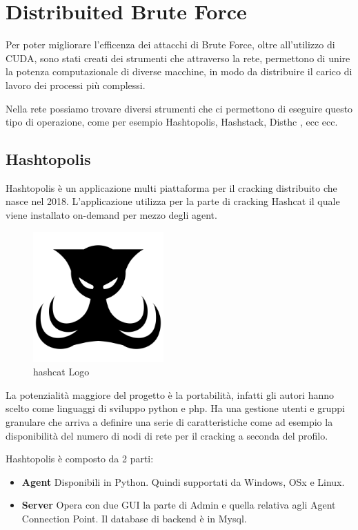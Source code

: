 \chapter{Distribuited Brute Force}

Per poter migliorare l'efficenza dei attacchi di Brute Force, oltre all'utilizzo di CUDA, sono stati creati dei strumenti che attraverso la rete, permettono di unire la potenza computazionale di diverse macchine, in modo da distribuire il carico di lavoro dei processi più complessi.

Nella rete possiamo trovare diversi strumenti che ci permettono di eseguire questo tipo di operazione, come per esempio Hashtopolis, Hashstack, Disthc , ecc ecc.

\section{Hashtopolis}

Hashtopolis \cite{hashtopolis} è un applicazione multi piattaforma per il cracking distribuito che nasce nel 2018. L’applicazione utilizza per la parte di cracking Hashcat il quale viene installato on-demand per mezzo degli agent. 

\begin{figure}[ht]
    \centering
    \includegraphics[width=50mm]{Immagini/8/hashtopoli_logo.png}
    \caption{hashcat Logo}
\end{figure}

La potenzialità maggiore del progetto è la portabilità, infatti gli autori hanno scelto come linguaggi di sviluppo python e php. Ha una gestione utenti e gruppi granulare che arriva a definire una serie di caratteristiche come ad esempio la disponibilità del numero di nodi di rete per il cracking a seconda del profilo.

Hashtopolis è composto da 2 parti:

\begin{itemize}
    \item \textbf{Agent} Disponibili in Python. Quindi supportati da Windows, OSx e Linux.
    \item \textbf{Server} Opera con due GUI la parte di Admin e quella relativa agli Agent Connection Point. Il database di backend è in Mysql.
\end{itemize}

